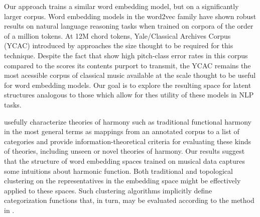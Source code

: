 Our approach trains a similar word embedding model, but on a significantly larger corpus. Word embedding models in the word2vec family have shown robust results on natural language reasoning tasks when trained on corpora of the order of a million tokens. At 12M chord tokens, Yale/Classical Archives Corpus (YCAC) introduced by \cite{white2014yale} approaches the size thought to be required for this technique. Despite the fact that \cite{Shanahan2013} show high pitch-class error rates in this corpus compared to the scores its contents purport to transmit, the YCAC remains the most acessible corpus of classical music available at the scale thought to be useful for word embedding models. Our goal is to explore the resulting space for latent structures analogous to those which allow for thes utility of these models in NLP tasks. 

\cite{jacoby_information_2015} usefully characterize theories of harmony such as traditional functional harmony in the most general terms as mappings from an annotated corpus to a list of categories and provide information-theoretical criteria for evaluating these kinds of theories, including unseen or novel theories of harmony. Our results suggest that the structure of word embedding spaces trained on musical data captures some intuitions about harmonic function. Both traditional and topological clustering on the representatives in the embedding space might be effectively applied to these spaces. Such clustering algorithms implicitly define categorization functions that, in turn, may be evaluated according to the method in \cite{jacoby_information_2015}.

